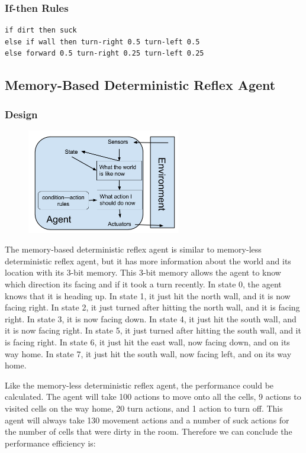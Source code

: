 \documentclass[a4paper,10pt]{article}
\begin{document}
\subsubsection{If-then Rules}
\begin{verbatim}
if dirt then suck
else if wall then turn-right 0.5 turn-left 0.5
else forward 0.5 turn-right 0.25 turn-left 0.25
\end{verbatim}


\subsection{Memory-Based Deterministic Reflex Agent}
\subsubsection{Design}
\begin{figure}[H]
	\begin{center}
		\includegraphics[width=0.6\textwidth]{MemoryReflex.png}
	\end{center}
\end{figure}

The memory-based deterministic reflex agent is similar to memory-less deterministic reflex agent, but it has more information about the world and its location with its 3-bit memory. 
This 3-bit memory allows the agent to know which direction its facing and if it took a turn recently.
In state 0, the agent knows that it is heading up.
In state 1, it just hit the north wall, and it is now facing right.
In state 2, it just turned after hitting the north wall, and it is facing right.
In state 3, it is now facing down. 
In state 4, it just hit the south wall, and it is now facing right.
In state 5, it just turned after hitting the south wall, and it is facing right.
In state 6, it just hit the east wall, now facing down, and on its way home.
In state 7, it just hit the south wall, now facing left, and on its way home.

Like the memory-less deterministic reflex agent, the performance could be calculated.
The agent will take 100 actions to move onto all the cells, 9 actions to visited cells on the way home, 20 turn actions, and 1 action to turn off. 
This agent will always take 130 movement actions and a number of suck actions for the number of cells that were dirty in the room. 
Therefore we can conclude the performance efficiency is:
\end{document}
